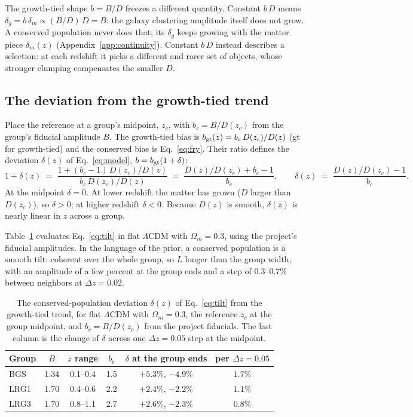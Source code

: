 \documentclass[11pt]{article}
\begin{document}
The growth-tied shape $b = B/D$ freezes a different quantity.  Constant
$b\,D$ means $\delta_g = b\,\delta_m \propto (B/D)\,D = B$: the galaxy
clustering amplitude itself does not grow.  A conserved population
never does that; its $\delta_g$ keeps growing with the matter piece
$\delta_m(z)$ (Appendix~\ref{app:continuity}).  Constant $b\,D$ instead describes a
selection: at each redshift it picks a different and rarer set of
objects, whose stronger clumping compensates the smaller $D$.

\subsection{The deviation from the growth-tied trend}
\label{sec:tilt}

Place the reference at a group's midpoint, $z_c$, with
$b_c = B/D(z_c)$ from the group's fiducial amplitude $B$.  The
growth-tied bias is $b_{\rm gt}(z) = b_c\, D(z_c)/D(z)$ (gt for
growth-tied) and the conserved bias is Eq.~\eqref{eq:fry}.  Their ratio
defines the deviation $\delta(z)$ of Eq.~\eqref{eq:model},
$b = b_{\rm gt}(1 + \delta)$:
\begin{equation}
  1 + \delta(z)
  \;=\;
  \frac{1 + (b_c - 1)\,D(z_c)/D(z)}{b_c\, D(z_c)/D(z)}
  \;=\;
  \frac{D(z)/D(z_c) + b_c - 1}{b_c},
  \qquad
  \delta(z)
  \;=\;
  \frac{D(z)/D(z_c) - 1}{b_c} .
  \label{eq:tilt}
\end{equation}
At the midpoint $\delta = 0$.  At lower redshift the matter has grown
($D$ larger than $D(z_c)$), so $\delta > 0$; at higher redshift
$\delta < 0$.  Because $D(z)$ is smooth, $\delta(z)$ is nearly linear
in $z$ across a group.

Table~\ref{tab:conserved} evaluates Eq.~\eqref{eq:tilt} in flat
$\Lambda$CDM with $\Omega_m = 0.3$, using the project's fiducial
amplitudes.  In the language of the prior, a conserved population is a
smooth tilt: coherent over the whole group, so $L$ longer than the
group width, with an amplitude of a few percent at the group ends and
a step of $0.3$--$0.7\%$ between neighbors at $\Delta z = 0.02$.

\begin{table}[ht]
  \centering
  \begin{tabular}{lccccc}
    \hline
    Group & $B$ & $z$ range & $b_c$ & $\delta$ at the group ends &
    per $\Delta z = 0.05$ \\
    \hline
    BGS  & 1.34 & 0.1--0.4 & 1.5 & $+5.3\%$, $-4.9\%$ & $1.7\%$ \\
    LRG1 & 1.70 & 0.4--0.6 & 2.2 & $+2.4\%$, $-2.2\%$ & $1.1\%$ \\
    LRG3 & 1.70 & 0.8--1.1 & 2.7 & $+2.6\%$, $-2.3\%$ & $0.8\%$ \\
    \hline
  \end{tabular}
  \caption{The conserved-population deviation $\delta(z)$ of
    Eq.~\eqref{eq:tilt} from the growth-tied trend, for flat $\Lambda$CDM with
    $\Omega_m = 0.3$, the reference $z_c$ at the group midpoint, and
    $b_c = B/D(z_c)$ from the project fiducials.  The last column is
    the change of $\delta$ across one $\Delta z = 0.05$ step at the
    midpoint.}
  \label{tab:conserved}
\end{table}
\end{document}
